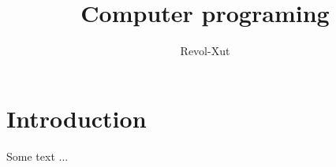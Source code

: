 \documentclass[a4paper,twoside]{scrbook}
\begin{document}
\title{Computer programing}

\author{Revol-Xut}


\frontmatter
\maketitle
\tableofcontents
\mainmatter



\chapter{Introduction}
Some text ...
\end{document}
